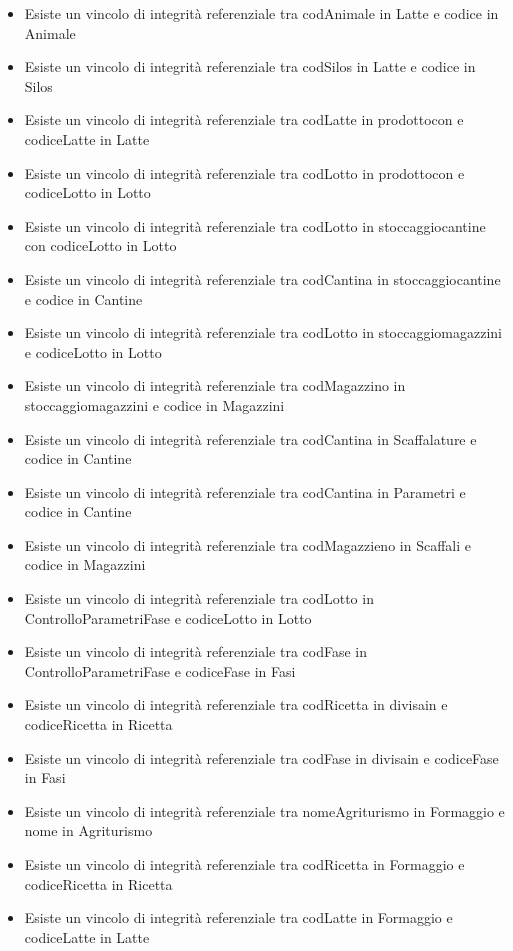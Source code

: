 \documentclass[12pt,a4paper]{article}
\begin{document}
\begin{itemize}
   \item Esiste un vincolo di integrità referenziale tra codAnimale in Latte e codice in Animale
   \item Esiste un vincolo di integrità referenziale tra codSilos in Latte e codice in Silos
   \item Esiste un vincolo di integrità referenziale tra codLatte in prodottocon e codiceLatte in Latte
   \item Esiste un vincolo di integrità referenziale tra codLotto in prodottocon e codiceLotto in Lotto
   \item Esiste un vincolo di integrità referenziale tra codLotto in stoccaggiocantine con codiceLotto in Lotto
   \item Esiste un vincolo di integrità referenziale tra codCantina in stoccaggiocantine e codice in Cantine
   \item Esiste un vincolo di integrità referenziale tra codLotto in stoccaggiomagazzini e codiceLotto in Lotto
   \item Esiste un vincolo di integrità referenziale tra codMagazzino in stoccaggiomagazzini e codice in Magazzini
   \item Esiste un vincolo di integrità referenziale tra codCantina in Scaffalature e codice in Cantine
   \item Esiste un vincolo di integrità referenziale tra codCantina in Parametri e codice in Cantine
   \item Esiste un vincolo di integrità referenziale tra codMagazzieno in Scaffali e codice in Magazzini
   \item Esiste un vincolo di integrità referenziale tra codLotto in ControlloParametriFase e codiceLotto in Lotto
   \item Esiste un vincolo di integrità referenziale tra codFase in ControlloParametriFase e codiceFase in Fasi
   \item Esiste un vincolo di integrità referenziale tra codRicetta in divisain e codiceRicetta in Ricetta
   \item Esiste un vincolo di integrità referenziale tra codFase in divisain e codiceFase in Fasi
   \item Esiste un vincolo di integrità referenziale tra nomeAgriturismo in Formaggio e nome in Agriturismo
   \item Esiste un vincolo di integrità referenziale tra codRicetta in Formaggio e codiceRicetta in Ricetta
   \item Esiste un vincolo di integrità referenziale tra codLatte in Formaggio e codiceLatte in Latte

\end{itemize}
\end{document}
